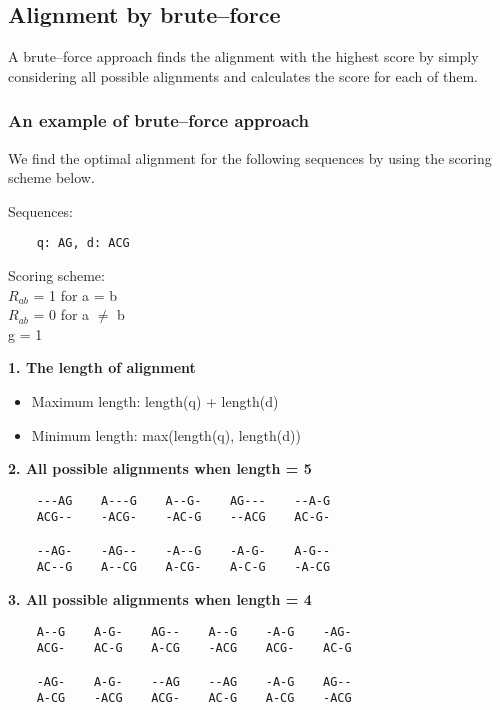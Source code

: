 %
%

%
%
\subsection{Alignment by brute--force}
A brute--force approach finds the alignment with the highest score by simply considering all possible alignments and calculates the score for each of them.

%
%
\subsubsection*{An example of brute--force approach}
We find the optimal alignment for the following sequences by using the scoring scheme below.

\begin{multicols}{2}
Sequences:
\begin{verbatim}
    q: AG, d: ACG
\end{verbatim}
\vfill\null
\columnbreak

\noindent Scoring scheme: \\ 
\null \quad $R_{ab}$ = 1 for a = b \\ 
\null \quad $R_{ab}$ = 0 for a $\neq$ b \\ 
\null \quad g = 1

\end{multicols} 

\noindent \textbf{1. The length of alignment}
\begin{itemize}
\item Maximum length: length(q) + length(d)
\item Minimum length: max(length(q), length(d))
\end{itemize}
\medskip 

\noindent \textbf{2. All possible alignments when length = 5}
\begin{verbatim}
    ---AG    A---G    A--G-    AG---    --A-G
    ACG--    -ACG-    -AC-G    --ACG    AC-G-

    --AG-    -AG--    -A--G    -A-G-    A-G--
    AC--G    A--CG    A-CG-    A-C-G    -A-CG
\end{verbatim}
\medskip

\noindent \textbf{3. All possible alignments when length = 4}
\begin{verbatim}
    A--G    A-G-    AG--    A--G    -A-G    -AG-
    ACG-    AC-G    A-CG    -ACG    ACG-    AC-G

    -AG-    A-G-    --AG    --AG    -A-G    AG--
    A-CG    -ACG    ACG-    AC-G    A-CG    -ACG
\end{verbatim}
\medskip

